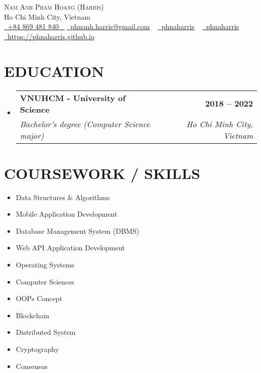 \documentclass[letterpaper,11pt]{article}
\makeatletter
\newcommand{\resumeItem}[1]{
	\item\small{
		{#1 \vspace{-2pt}}
	}
}
\newcommand{\resumeSubheading}[4]{
	\vspace{-2pt}\item
	\begin{tabular*}{1.0\textwidth}[t]{l@{\extracolsep{\fill}}r}
		\textbf{\large#1} & \textbf{\small #2} \\
		\textit{\large#3} & \textit{\small #4} \\

	\end{tabular*}\vspace{-7pt}
}
\newcommand{\resumeSubHeadingListStart}{\begin{itemize}[leftmargin=0.0in, label={}]}
\newcommand{\resumeSubHeadingListEnd}{\end{itemize}}
\newcommand{\resumeItemListStart}{\begin{itemize}}
\newcommand{\resumeItemListEnd}{\end{itemize}\vspace{-5pt}}
\makeatother
\begin{document}
\begin{center}
	{\Huge \scshape Nam Anh Pham Hoang (Harris)} \\ \vspace{1pt}
	Ho Chi Minh City, Vietnam \\ \vspace{1pt}
	\small \href{tel:+84 869 481 840}{ \raisebox{-0.1\height}\faPhone\ \underline{+84 869 481 840} ~}
	\href{mailto:phnanh.harris@gmail.com}{\raisebox{-0.2\height}\faEnvelope\  \underline{phnanh.harris@gmail.com}} ~
	\href{https://linkedin.com/in/phnaharris}{\raisebox{-0.2\height}\faLinkedinSquare\ \underline{phnaharris}}  ~
	\href{https://github.com/phnaharris}{\raisebox{-0.2\height}\faGithub\ \underline{phnaharris}} ~
	\href{https://phnaharris.github.io}{\raisebox{-0.2\height}\faGlobe\  \underline{https://phnaharris.github.io}} ~
\end{center}
\vspace{-8pt}


\vspace{-8pt}
\section{EDUCATION}
\vspace{5pt}
\resumeSubHeadingListStart
\resumeSubheading
{VNUHCM - University of Science}{2018 -- 2022}
{Bachelor's degree (Computer Science major)}{Ho Chi Minh City, Vietnam}
\resumeSubHeadingListEnd
\vspace{-8pt}


\section{COURSEWORK / SKILLS}
\begin{multicols}{4}
	\resumeItemListStart
	\resumeItem{Data Structures \& Algorithms}
	\resumeItem{Mobile Application Development}
	\resumeItem{Database Management System (DBMS)}
	\resumeItem{Web API Application Development}
	\resumeItem{Operating Systems}
	\resumeItem{Computer Sciences}
	\resumeItem{OOPs Concept}
	\resumeItem{Blockchain}
	\resumeItem{Distributed System}
	\resumeItem{Cryptography}
	\resumeItem{Consensus}
	\resumeItemListEnd
\end{multicols}


\end{document}
